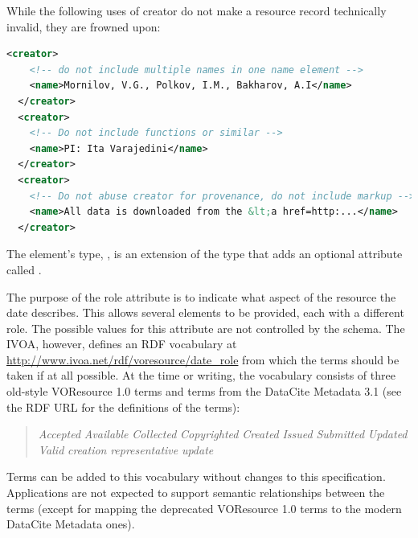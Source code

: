 \documentclass[11pt,a4paper]{ivoa}
\begin{document}
While the following uses of creator do not make a resource record
technically invalid, they are frowned upon:

\begin{lstlisting}[language=XML,basicstyle=\footnotesize]
  <creator>
    <!-- do not include multiple names in one name element -->
    <name>Mornilov, V.G., Polkov, I.M., Bakharov, A.I</name>
  </creator>
  <creator>
    <!-- Do not include functions or similar -->
    <name>PI: Ita Varajedini</name>
  </creator>
  <creator>
    <!-- Do not abuse creator for provenance, do not include markup -->
    <name>All data is downloaded from the &lt;a href=http:...</name>
  </creator>
\end{lstlisting}

The  element's type, , is an extension of the
 type that adds an
optional attribute called .  

The purpose of the role attribute is to indicate what aspect of the
resource the date describes. This allows several  elements to be
provided, each with a different role. The possible values for this
attribute are not controlled by the schema.  The IVOA, however, defines
an RDF vocabulary at
\url{http://www.ivoa.net/rdf/voresource/date_role} from
which the  terms should be taken if at all possible.  At the
time or writing, the vocabulary consists of three old-style VOResource
1.0 terms and terms from the DataCite Metadata 3.1 (see the RDF URL for
the definitions of the terms):

\begin{quotation}\noindent
\textsl{Accepted}
\textsl{Available}
\textsl{Collected}
\textsl{Copyrighted}
\textsl{Created}
\textsl{Issued}
\textsl{Submitted}
\textsl{Updated}
\textsl{Valid}
\textsl{creation}
\textsl{representative}
\textsl{update}

\end{quotation}


Terms can be added to this vocabulary without changes to this
specification.  Applications are not expected to support semantic
relationships between the terms (except for mapping the deprecated
VOResource 1.0 terms to the modern DataCite Metadata ones).
\end{document}
